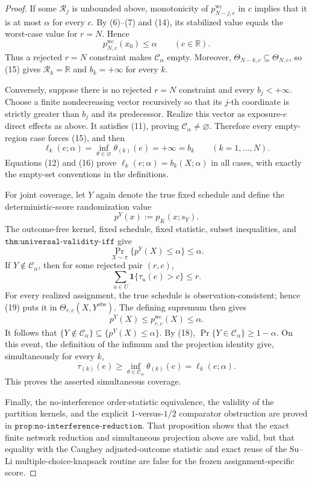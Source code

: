 \documentclass{article}
\begin{document}
\begin{proof}
If some \(\mathcal R_j\) is unbounded above, monotonicity of \(p^{\mathrm{wc}}_{N-j,c}\) in \(c\) implies that it is at most \(\alpha\) for every \(c\).  By (6)--(7) and (14), its stabilized value equals the worst-case value for \(r=N\).  Hence
\[
 p^{\mathrm{wc}}_{N,c}(x_0)\leq\alpha
 \qquad(c\in\mathbb R).
\tag{15}
\]
Thus a rejected \(r=N\) constraint makes \(\mathcal C_\alpha\) empty.  Moreover, \(\Theta_{N-k,c}\subseteq\Theta_{N,c}\), so (15) gives \(\mathcal R_k=\mathbb R\) and \(b_k=+\infty\) for every \(k\).

Conversely, suppose there is no rejected \(r=N\) constraint and every \(b_j<+\infty\).  Choose a finite nondecreasing vector recursively so that its \(j\)-th coordinate is strictly greater than \(b_j\) and its predecessor.  Realize this vector as exposure-\(e\) direct effects as above.  It satisfies (11), proving \(\mathcal C_\alpha\neq\varnothing\).  Therefore every empty-region case forces (15), and then
\[
 \ell_k(e;\alpha)
 =\inf_{\theta\in\varnothing}\theta_{(k)}(e)
 =+\infty=b_k
 \qquad(k=1,\ldots,N).
\tag{16}
\]
Equations (12) and (16) prove \(\ell_k(e;\alpha)=b_k(X;\alpha)\) in all cases, with exactly the empty-set conventions in the definitions.

For joint coverage, let \(Y\) again denote the true fixed schedule and define the deterministic-score randomization value
\[
 p^Y(x):=p_K(x;s_Y).
\tag{17}
\]
The outcome-free kernel, fixed schedule, fixed statistic, subset inequalities, and \(\texttt{thm:universal-validity-iff}\) give
\[
 \Pr_{X\sim\pi}\{p^Y(X)\leq\alpha\}\leq\alpha.
\tag{18}
\]
If \(Y\notin\mathcal C_\alpha\), then for some rejected pair \((r,c)\),
\[
 \sum_{u\in U}\mathbf 1\{\tau_u(e)>c\}\leq r.
\tag{19}
\]
For every realized assignment, the true schedule is observation-consistent; hence (19) puts it in \(\Theta_{r,c}(X,Y^{\mathrm{obs}})\).  The defining supremum then gives
\[
 p^Y(X)\leq p^{\mathrm{wc}}_{r,c}(X)\leq\alpha.
\tag{20}
\]
It follows that \(\{Y\notin\mathcal C_\alpha\}\subseteq\{p^Y(X)\leq\alpha\}\).  By (18), \(\Pr\{Y\in\mathcal C_\alpha\}\geq1-\alpha\).  On this event, the definition of the infimum and the projection identity give, simultaneously for every \(k\),
\[
 \tau_{(k)}(e)
 \geq\inf_{\theta\in\mathcal C_\alpha}\theta_{(k)}(e)
 =\ell_k(e;\alpha).
\tag{21}
\]
This proves the asserted simultaneous coverage.

Finally, the no-interference order-statistic equivalence, the validity of the partition kernels, and the explicit \(1\)-versus-\(1/2\) comparator obstruction are proved in \(\texttt{prop:no-interference-reduction}\).  That proposition shows that the exact finite network reduction and simultaneous projection above are valid, but that equality with the Caughey adjusted-outcome statistic and exact reuse of the Su--Li multiple-choice-knapsack routine are false for the frozen assignment-specific score.
\end{proof}
\end{document}

